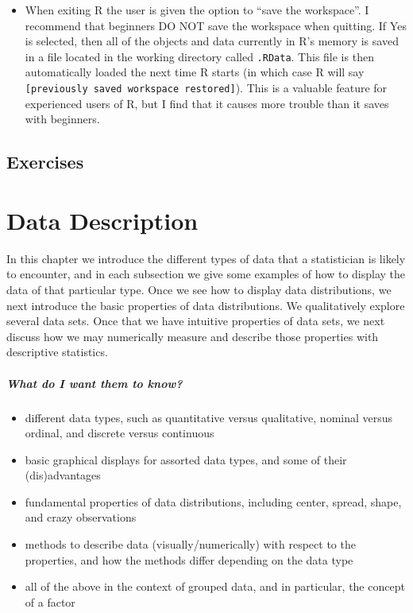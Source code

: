 \documentclass[captions=tableheading]{scrbook}
\begin{document}
\begin{itemize}
\item When exiting \textsf{R} the user is given the option to ``save the workspace''. I recommend that beginners DO NOT save the workspace when quitting. If \textsf{Yes} is selected, then all of the objects and data currently in \textsf{R}'s memory is saved in a file located in the working directory called \texttt{.RData}. This file is then automatically loaded the next time \textsf{R} starts (in which case \textsf{R} will say \texttt{[previously saved workspace restored]}). This is a valuable feature for experienced users of \textsf{R}, but I find that it causes more trouble than it saves with beginners.
\end{itemize}

\newpage{}
\section{Exercises}
\label{sec-2-7}

\setcounter{thm}{0}
\chapter{Data Description}
\label{sec-3}

\label{cha:Describing-Data-Distributions}


\noindent In this chapter we introduce the different types of data that a statistician is likely to encounter, and in each subsection we give some examples of how to display the data of that particular type. Once we see how to display data distributions, we next introduce the basic properties of data distributions. We qualitatively explore several data sets. Once that we have intuitive properties of data sets, we next discuss how we may numerically measure and describe those properties with descriptive statistics.

\paragraph*{What do I want them to know?}

\begin{itemize}
\item different data types, such as quantitative versus qualitative, nominal versus ordinal, and discrete versus continuous
\item basic graphical displays for assorted data types, and some of their (dis)advantages
\item fundamental properties of data distributions, including center, spread, shape, and crazy observations
\item methods to describe data (visually/numerically) with respect to the properties, and how the methods differ depending on the data type
\item all of the above in the context of grouped data, and in particular, the concept of a factor
\end{itemize}
\end{document}
